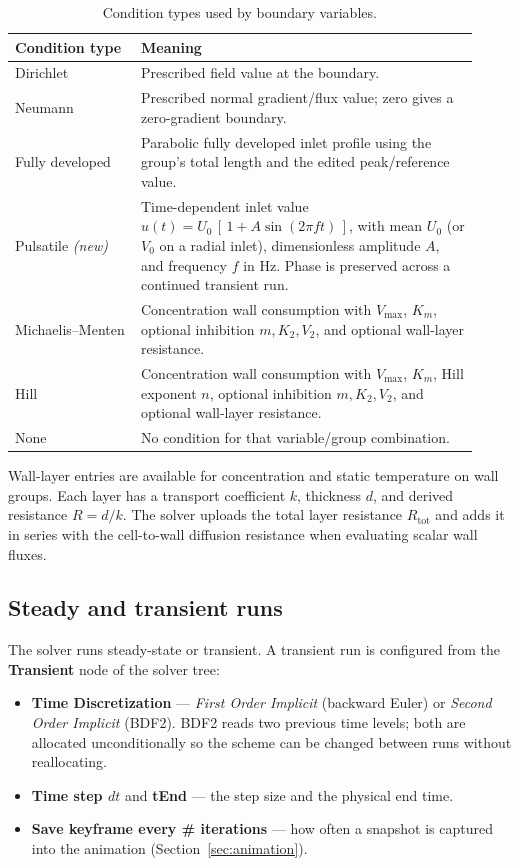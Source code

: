 \documentclass[11pt]{article}
\begin{document}
\begin{table}[h]
\centering
\caption{Condition types used by boundary variables.}
\label{tab:bctypes}
\begin{tabular}{@{}>{\raggedright\arraybackslash}p{0.25\linewidth}
                   >{\raggedright\arraybackslash}p{0.67\linewidth}@{}}
\toprule
\textbf{Condition type} & \textbf{Meaning} \\
\midrule
Dirichlet & Prescribed field value at the boundary. \\
Neumann & Prescribed normal gradient/flux value; zero gives a zero-gradient boundary. \\
Fully developed & Parabolic fully developed inlet profile using the group's total length and the edited peak/reference value. \\
Pulsatile \emph{(new)} & Time-dependent inlet value \(u(t) = U_0\,[\,1 + A\sin(2\pi f t)\,]\), with mean \(U_0\) (or \(V_0\) on a radial inlet), dimensionless amplitude \(A\), and frequency \(f\) in Hz. Phase is preserved across a continued transient run. \\
Michaelis--Menten & Concentration wall consumption with \(V_{\max}\), \(K_m\), optional inhibition \(m,K_2,V_2\), and optional wall-layer resistance. \\
Hill & Concentration wall consumption with \(V_{\max}\), \(K_m\), Hill exponent \(n\), optional inhibition \(m,K_2,V_2\), and optional wall-layer resistance. \\
None & No condition for that variable/group combination. \\
\bottomrule
\end{tabular}
\end{table}

Wall-layer entries are available for concentration and static temperature on wall
groups. Each layer has a transport coefficient \(k\), thickness \(d\), and derived
resistance \(R=d/k\). The solver uploads the total layer resistance
\(R_{\mathrm{tot}}\) and adds it in series with the cell-to-wall diffusion resistance
when evaluating scalar wall fluxes.

\subsection{Steady and transient runs}\label{sec:transient}
The solver runs steady-state or transient. A transient run is configured from the
\textbf{Transient} node of the solver tree:

\begin{itemize}[nosep]
  \item \textbf{Time Discretization} --- \emph{First Order Implicit} (backward Euler) or
        \emph{Second Order Implicit} (BDF2). BDF2 reads two previous time levels; both
        are allocated unconditionally so the scheme can be changed between runs without
        reallocating.
  \item \textbf{Time step \(dt\)} and \textbf{tEnd} --- the step size and the physical
        end time.
  \item \textbf{Save keyframe every \# iterations} --- how often a snapshot is captured
        into the animation (Section~\ref{sec:animation}).
\end{itemize}
\end{document}

